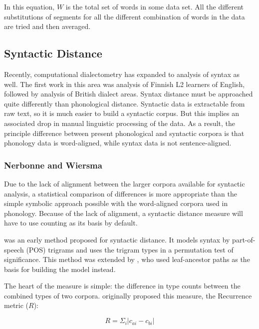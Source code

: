 \documentclass[11pt]{article}
\begin{document}
In this equation, $W$ is the total set of words in some data set. All
the different substitutions of segments for all the different
combination of words in the data are tried and then averaged.

\subsection{Syntactic  Distance}
Recently, computational dialectometry has expanded to analysis of
syntax as well. The first work in this area was 
analysis of Finnish L2 learners of English, followed by
 analysis of British dialect areas. Syntax
distance must be approached quite differently than phonological
distance. Syntactic data is extractable from raw text, so it is much
easier to build a syntactic corpus. But this implies an associated
drop in manual linguistic processing of the data. As a result, the
principle difference between present phonological and syntactic
corpora is that phonology data is word-aligned, while syntax data is
not sentence-aligned.

\subsubsection{Nerbonne and Wiersma}
\label{nerbonne06}

Due to the lack of alignment between the
larger corpora available for syntactic analysis, a statistical
comparison of differences is more appropriate than the simple
symbolic approach possible with the word-aligned corpora used in
phonology. Because of the lack of alignment, a syntactic distance
measure will have to use counting as its basis by default.

 was an early method proposed for syntactic
distance.  It models syntax by part-of-speech (POS) trigrams and uses
the trigram types in a permutation test of significance. This method was
extended by , who used 
leaf-ancestor paths as the basis for building the model instead.

The heart of the measure is simple: the difference in type counts
between the combined types of two corpora. 
originally proposed this measure, the {\sc Recurrence}
metric ($R$):

\begin{equation}
R = \Sigma_i |c_{ai} - c_{bi}|
\label{rmeasure}
\end{equation}
\end{document}
